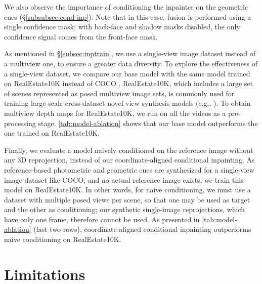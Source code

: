 We also observe the importance of conditioning the inpainter on the geometric cues (\S\ref{subsubsec:cond-inp}).
Note that in this case, fusion is performed using a single confidence mask; with back-face and shadow masks disabled, the only confidence signal comes from the front-face mask.

As mentioned in \S\ref{subsec:inptrain}, we use a single-view image dataset instead of a multiview one, to ensure a greater data diversity. To explore the effectiveness of a single-view dataset, we compare our base model with the same model trained on RealEstate10K \cite{realestate10k} instead of COCO \cite{coco.dataset}. 
RealEstate10K, which includes a large set of scenes represented as posed multiview image sets, is commonly used for training large-scale cross-dataset novel view synthesis models (e.g., \cite{wang2021ibrnet,yu2024polyoculus}). 
To obtain multiview depth maps for RealEstate10K, we run \duster on all the videos as a pre-processing stage. \cref{tab:model-ablation} shows that our base model outperforms the one trained on RealEstate10K.

Finally, we evaluate a model naively conditioned on the reference image without any 3D reprojection, instead of our coordinate-aligned conditional inpainting. As reference-based photometric and geometric cues are synthesized for a single-view image dataset like COCO, and no actual reference image exists, we train this model on RealEstate10K.
In other words, for naive conditioning,
we must use a dataset with multiple posed views per scene,
so that one may be used as target and the other as conditioning;
our synthetic single-image reprojections, which have only one frame, therefore cannot be used. 
As presented in \cref{tab:model-ablation} (last two rows), coordinate-aligned conditional inpainting outperforms naive conditioning on RealEstate10K.

\section{Limitations}
\label{supp:sec:limitations}

